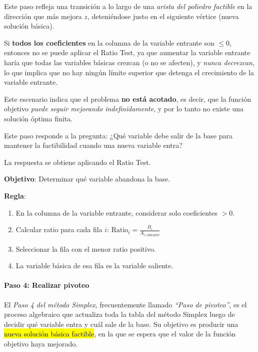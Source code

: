 Este paso refleja una transición a lo largo de una \emph{arista del poliedro factible} en la dirección que más mejora \(z\), deteniéndose justo en el
siguiente vértice (nueva solución básica).

\begin{tcolorbox}[interesting_data, title=Caso especial: problema no acotado]
  Si \textbf{todos los coeficientes} en la columna de la variable entrante son \(\leq 0\), entonces no se puede aplicar el Ratio Test, ya que aumentar la variable entrante haría que todas las variables básicas crezcan (o no se afecten), y \emph{nunca decrezcan}, lo que implica que no hay ningún límite superior que detenga el crecimiento de la variable entrante.

  Este escenario indica que el problema \textbf{no está acotado}, es decir, que la función objetivo \emph{puede seguir mejorando indefinidamente}, y por lo tanto no existe una solución óptima finita.
\end{tcolorbox}

Este paso responde a la pregunta: ¿Qué variable debe salir de la base para mantener la factibilidad cuando una nueva variable entra?

La respuesta se obtiene aplicando el Ratio Test.

\begin{tcolorbox}[title=Resumen del paso 3]
  \noindent \textbf{Objetivo}: Determinar qué variable abandona la base.
  
  \noindent \textbf{Regla}:
  \begin{enumerate}
    \item En la columna de la variable entrante, considerar solo coeficientes \(> 0\).
    \item Calcular ratio para cada fila \(i\): 
     \(
     \text{Ratio}_i = \frac{B_i}{A_{i,\text{entrante}}}
     \)
    \item Seleccionar la fila con el menor ratio positivo.
    \item La variable básica de esa fila es la variable saliente.
  \end{enumerate}
\end{tcolorbox}

\paragraph{Paso 4: Realizar pivoteo}

El \textit{Paso 4 del método Simplex}, frecuentemente llamado \textit{``Paso de pivoteo''}, es el proceso algebraico que actualiza toda la tabla del método Simplex luego de decidir qué variable entra y cuál sale de la base. Su objetivo es producir una \hl{nueva solución básica factible}, en la que se espera que el valor de la función objetivo haya mejorado.

